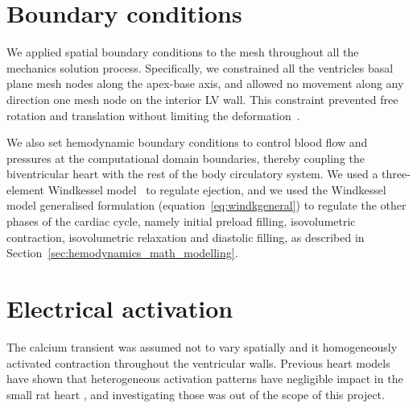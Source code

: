 %
%
%
\section{Boundary conditions}\label{sec:boundaryconditions}
We applied spatial boundary conditions to the mesh throughout all the mechanics solution process. Specifically, we constrained all the ventricles basal plane mesh nodes along the apex-base axis, and allowed no movement along any direction one mesh node on the interior LV wall. This constraint prevented free rotation and translation without limiting the deformation~\cite{Land:2012}.

\vspace{0.2cm}
We also set hemodynamic boundary conditions to control blood flow and pressures at the computational domain boundaries, thereby coupling the biventricular heart with the rest of the body circulatory system. We used a three-element Windkessel model~\cite{Westerhof:1971} to regulate ejection, and we used the Windkessel model generalised formulation (equation~\eqref{eq:windkgeneral}) to regulate the other phases of the cardiac cycle, namely initial preload filling, isovolumetric contraction, isovolumetric relaxation and diastolic filling, as described in Section~\ref{sec:hemodynamics_math_modelling}.


%
%
%
\section{Electrical activation}\label{sec:electricalactivation}
The calcium transient was assumed not to vary spatially and it homogeneously activated contraction throughout the ventricular walls. Previous heart models
have shown that heterogeneous activation patterns have negligible impact in the small rat heart , and investigating those was out of the scope of this project.




